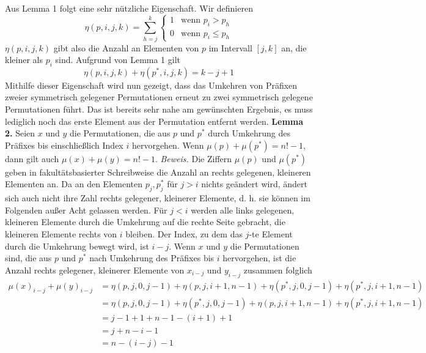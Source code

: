 \documentclass[a4paper, 11pt, ngerman]{article}
\begin{document}
\newline \newline
Aus Lemma 1 folgt eine sehr nützliche Eigenschaft. Wir definieren
$$
    \eta(p, i, j, k) = \sum_{h = j}^k \begin{cases}
        1 & \text{wenn } p_i > p_h   \\
        0 & \text{wenn } p_i \le p_h
    \end{cases}
$$
$\eta(p, i, j, k)$ gibt also die Anzahl an Elementen von $p$ im Intervall $[j, k]$ an, die kleiner als $p_i$ sind. Aufgrund von Lemma 1 gilt
$$
    \eta(p, i, j, k) + \eta(p^*, i, j, k) = k - j + 1
$$
Mithilfe dieser Eigenschaft wird nun gezeigt, dass das Umkehren von Präfixen zweier symmetrisch gelegener Permutationen erneut zu zwei symmetrisch gelegene Permutationen führt. Das ist bereits sehr nahe am gewünschten Ergebnis, es muss lediglich noch das erste Element aus der Permutation entfernt werden.
\newline \newline
\textbf{Lemma 2.} Seien $x$ und $y$ die Permutationen, die aus $p$ und $p^*$ durch Umkehrung des Präfixes bis einschließlich Index $i$ hervorgehen. Wenn $\mu(p) + \mu(p^*) = n! - 1$, dann gilt auch $\mu(x) + \mu(y) = n! - 1$.
\newline \newline
\emph{Beweis.} Die Ziffern $\mu(p)$ und $\mu(p^*)$ geben in fakultätsbasierter Schreibweise die Anzahl an rechts gelegenen, kleineren Elementen an. Da an den Elementen $p_j, p^*_j$ für $j > i$ nichts geändert wird, ändert sich auch nicht ihre Zahl rechts gelegener, kleinerer Elemente, d. h. sie können im Folgenden außer Acht gelassen werden. Für $j < i$ werden alle links gelegenen, kleineren Elemente durch die Umkehrung auf die rechte Seite gebracht, die kleineren Elemente rechts von $i$ bleiben. Der Index, zu dem das $j$-te Element durch die Umkehrung bewegt wird, ist $i - j$. Wenn $x$ und $y$ die Permutationen sind, die aus $p$ und $p^*$ nach Umkehrung des Präfixes bis $i$ hervorgehen, ist die Anzahl rechts gelegener, kleinerer Elemente von $x_{i - j}$ und $y_{i - j}$ zusammen folglich
\begin{align*}
    \mu(x)_{i - j} + \mu(y)_{i - j}
     & = \eta(p, j, 0, j - 1) + \eta(p, j, i + 1, n - 1) + \eta(p^*, j, 0, j - 1) + \eta(p^*, j, i + 1, n - 1) \\
     & = \eta(p, j, 0, j - 1) + \eta(p^*, j, 0, j - 1) + \eta(p, j, i + 1, n - 1) + \eta(p^*, j, i + 1, n - 1) \\
     & = j - 1 + 1 + n - 1 - (i + 1) + 1                                                                       \\
     & = j + n - i - 1                                                                                         \\
     & = n - (i - j) - 1
\end{align*}
\end{document}
